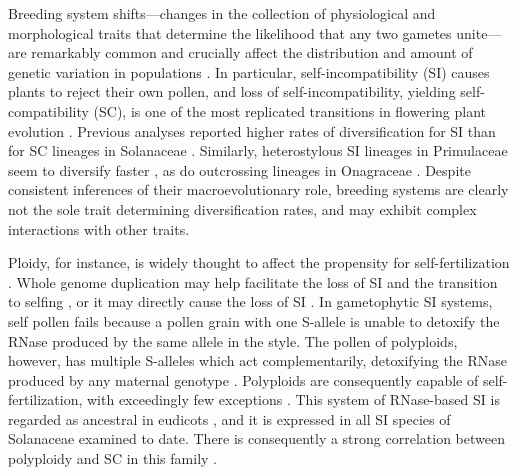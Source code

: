 Breeding system shifts---changes in the collection of physiological and morphological traits that determine the likelihood that any two gametes unite---are remarkably common and crucially affect the distribution and amount of genetic variation in populations \citep{stebbins1974, barrett2013}.
In particular, self-incompatibility (SI) causes plants to reject their own pollen, and loss of self-incompatibility, yielding self-compatibility (SC), is one of the most replicated transitions in flowering plant evolution \citep{stebbins1974, igic_2008}.
Previous analyses reported higher rates of diversification for SI than for SC lineages in Solanaceae \citep{goldberg_2010}. 
Similarly, heterostylous SI lineages in Primulaceae seem to diversify faster \citep{devos2014}, as do outcrossing lineages in Onagraceae \citep{freyman_2019}.
Despite consistent inferences of their macroevolutionary role, breeding systems are clearly not the sole trait determining diversification rates, and may exhibit complex interactions with other traits.

Ploidy, for instance, is widely thought to affect the propensity for self-fertilization \citep{stebbins1950}. 
Whole genome duplication may help facilitate the loss of SI and the transition to selfing \citep{barringer2007, barrett2008, husband2008}, or it may directly cause the loss of SI \citep{stout1942, lewis1947}.
In gametophytic SI systems, self pollen fails because a pollen grain with one S-allele is unable to detoxify the RNase produced by the same allele in the style. %
The pollen of polyploids, however, has multiple S-alleles which act complementarily, detoxifying the RNase produced by any maternal genotype \citep{entani1999, tsukamoto2005, kubo2010}.
Polyploids are consequently capable of self-fertilization, with exceedingly few exceptions \citep{hauck_2002, nunes_2006}.
This system of RNase-based SI is regarded as ancestral in eudicots \citep{igic_2001,steinbachs_2002}, and it is expressed in all SI species of Solanaceae examined to date.
There is consequently a strong correlation between polyploidy and SC in this family \citep{robertson_2011}.

